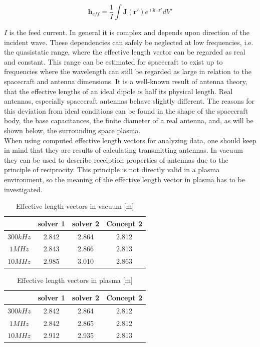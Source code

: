 \documentclass[a4paper,11pt]{article}
\begin{document}
\begin{equation}
\textbf{h}_{eff}=\frac{1}{I}\int \mathbf{J}(\mathbf{r}')e^{\imath \mathbf{k} \cdot \mathbf{r}'} dV'
 \end{equation}

$I$ is the feed current. In general it is complex and depends upon direction of the incident wave. These dependencies can safely be neglected at low frequencies, i.e. the quasistatic range, where the effective length vector can be regarded as real and constant. This range can be estimated for spacecraft to exist up to frequencies where the wavelength can still be regarded as large in relation to the spacecraft and antenna dimensions. It is a well-known result of antenna theory, that the effective lengths of an ideal dipole is half its physical length. Real antennas, especially spacecraft antennas behave slightly different. The reasons for this deviation from ideal conditions can be found in the shape of the spacecraft body, the base capacitances, the finite diameter of a real antenna, and, as will be shown below, the surrounding space plasma.\\

When using computed effective length vectors for analyzing data, one should keep in mind that they are results of calculating transmitting antennas. In vacuum they can be used to describe receiption properties of antennas due to the principle of reciprocity. This principle is not directly valid in a plasma environment, so the meaning of the effective length vector in plasma has to be investigated.\\


\begin{table}
\begin{center}
\caption{Effective length vectors in vacuum [m]}
\label{tab:heff_vacuum}
\begin{tabular}{|c|c|c|c|}
 \hline
 & solver 1  & solver 2  & Concept 2 \\
\hline
$300 kHz$ & 2.842 & 2.864 & 2.812 \\
$1 MHz$ & 2.843 & 2.866 &  2.813 \\
$10 MHz$ & 2.985 & 3.010 &  2.863  \\

\hline
\end{tabular}
\end{center}
\end{table}

\begin{table}
\begin{center}
\caption{Effective length vectors in plasma [m]}
\label{tab:heff_plasma}
\begin{tabular}{|c|c|c|c|}
 \hline
 & solver 1  & solver 2  & Concept 2 \\
\hline
$300 kHz$ & 2.842 & 2.864 & 2.812  \\
$1 MHz$ & 2.842 & 2.865 & 2.812  \\
$10 MHz$ & 2.912 & 2.935 & 2.813 \\

\hline
\end{tabular}
\end{center}
\end{table}
\end{document}

